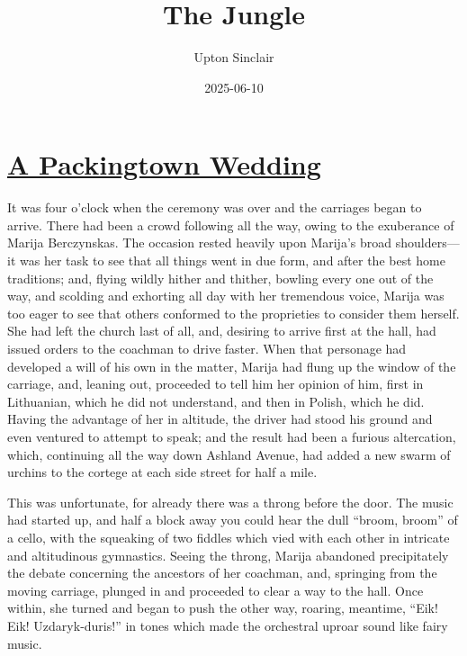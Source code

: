 \documentclass[
]{book}
\title{The Jungle}
\author{Upton Sinclair}
\date{2025-06-10}
\begin{document}
\maketitle

{
\setcounter{tocdepth}{1}
\tableofcontents
}
\chapter{\texorpdfstring{\href{https://www.marxists.org/history/usa/pubs/appeal-to-reason/050225-appealtoreason-w482-thejungle.pdf}{A Packingtown Wedding}}{A Packingtown Wedding}}\label{a-packingtown-wedding}

It was four o'clock when the ceremony was over and the carriages began to arrive. There had been a crowd following all the way, owing to the exuberance of Marija Berczynskas. The occasion rested heavily upon Marija's broad shoulders---it was her task to see that all things went in due form, and after the best home traditions; and, flying wildly hither and thither, bowling every one out of the way, and scolding and exhorting all day with her tremendous voice, Marija was too eager to see that others conformed to the proprieties to consider them herself. She had left the church last of all, and, desiring to arrive first at the hall, had issued orders to the coachman to drive faster. When that personage had developed a will of his own in the matter, Marija had flung up the window of the carriage, and, leaning out, proceeded to tell him her opinion of him, first in Lithuanian, which he did not understand, and then in Polish, which he did. Having the advantage of her in altitude, the driver had stood his ground and even ventured to attempt to speak; and the result had been a furious altercation, which, continuing all the way down Ashland Avenue, had added a new swarm of urchins to the cortege at each side street for half a mile.

This was unfortunate, for already there was a throng before the door. The music had started up, and half a block away you could hear the dull ``broom, broom'' of a cello, with the squeaking of two fiddles which vied with each other in intricate and altitudinous gymnastics. Seeing the throng, Marija abandoned precipitately the debate concerning the ancestors of her coachman, and, springing from the moving carriage, plunged in and proceeded to clear a way to the hall. Once within, she turned and began to push the other way, roaring, meantime, ``Eik! Eik! Uzdaryk-duris!'' in tones which made the orchestral uproar sound like fairy music.
\end{document}
